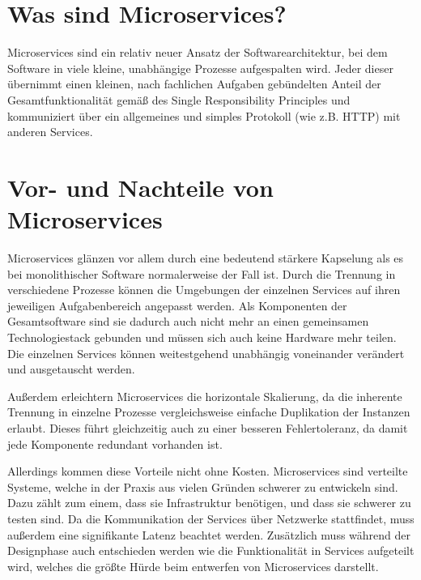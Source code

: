 \documentclass{article}
\begin{document}
\section{Was sind Microservices?}

Microservices sind ein relativ neuer Ansatz der Softwarearchitektur, bei dem Software in viele kleine, unabhängige Prozesse aufgespalten wird\cite{OMA}. Jeder dieser übernimmt einen kleinen, nach fachlichen Aufgaben gebündelten Anteil der Gesamtfunktionalität gemäß des Single Responsibility Principles und kommuniziert über ein allgemeines und simples Protokoll (wie z.B. HTTP) mit anderen Services\cite{EMMA}.

\section{Vor- und Nachteile von Microservices}

Microservices glänzen vor allem durch eine bedeutend stärkere Kapselung als es bei monolithischer Software normalerweise der Fall ist. Durch die Trennung in verschiedene Prozesse können die Umgebungen der einzelnen Services auf ihren jeweiligen Aufgabenbereich angepasst werden. Als Komponenten der Gesamtsoftware sind sie dadurch auch nicht mehr an einen gemeinsamen Technologiestack gebunden und müssen sich auch keine Hardware mehr teilen. Die einzelnen Services können weitestgehend unabhängig voneinander verändert und ausgetauscht werden.

Außerdem erleichtern Microservices die horizontale Skalierung, da die inherente Trennung in einzelne Prozesse vergleichsweise einfache Duplikation der Instanzen erlaubt. Dieses führt gleichzeitig auch zu einer besseren Fehlertoleranz, da damit jede Komponente redundant vorhanden ist.

Allerdings kommen diese Vorteile nicht ohne Kosten. Microservices sind verteilte Systeme, welche in der Praxis aus vielen Gründen schwerer zu entwickeln sind. Dazu zählt zum einem, dass sie Infrastruktur benötigen, und dass sie schwerer zu testen sind. Da die Kommunikation der Services über Netzwerke stattfindet, muss außerdem eine signifikante Latenz beachtet werden. Zusätzlich muss während der Designphase auch entschieden werden wie die Funktionalität in Services aufgeteilt wird, welches die größte Hürde beim entwerfen von Microservices darstellt.\cite{OMA}
\end{document}

